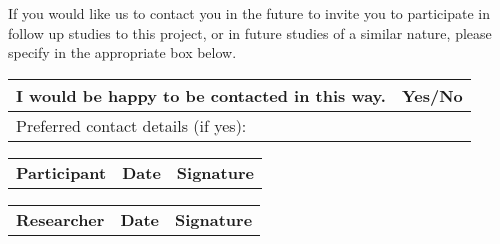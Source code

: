 \documentclass[12pt]{article}
\begin{document}
\vspace{2ex}
\noindent
If you would like us to contact you in the future to invite you to participate in follow up studies to this project, or in future studies of a similar nature, please specify in the appropriate box below.

\bigskip

\renewcommand{\arraystretch}{1.5}
\noindent
\begin{tabularx}{\textwidth}{|X|c|}
    \hline
    I would be happy to be contacted in this way. & Yes/No \\
    \hline
    Preferred contact details (if yes): & \\
    \hline
\end{tabularx}
\renewcommand{\arraystretch}{1}

\vspace*{4cm} %

\noindent
\begin{tabular}{p{} p{} p{}}
\textbf{Participant} \hrulefill & \textbf{Date} \hrulefill & \textbf{Signature} \hrulefill \\
\end{tabular}

\bigskip
\bigskip
\bigskip

\noindent
\begin{tabular}{p{} p{} p{}}
\textbf{Researcher} \hrulefill & \textbf{Date} \hrulefill & \textbf{Signature} \hrulefill \\
\end{tabular}
\end{document}
